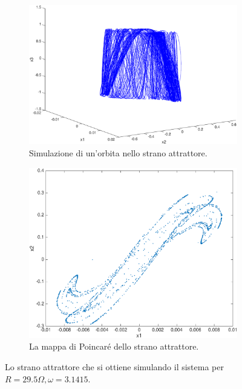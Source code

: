 \begin{figure}
    \centering
    \begin{subfigure}[b]{0.8\textwidth}
        \includegraphics[width=\textwidth]{matcont/StranoAttrattore}
        \caption{Simulazione di un'orbita nello strano attrattore.}
    \end{subfigure}
    \par\bigskip
    \begin{subfigure}[b]{0.8\textwidth}
        \includegraphics[width=\textwidth]{matcont/PoincareCaos}
        \caption{La mappa di Poincaré dello strano attrattore.}
    \end{subfigure}
    \caption{Lo strano attrattore che si ottiene simulando il sistema per $R=29.5 \Omega, \omega = 3.1415$.}
    \label{fig:strano-attrattore}
\end{figure}
